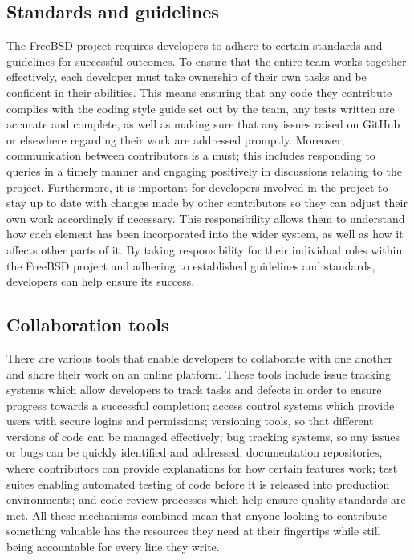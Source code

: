 \documentclass[12pt, dvipsnames, a4paper]{article}
\begin{document}
\subsection{	Standards and guidelines}
The FreeBSD project requires developers to adhere to certain standards and guidelines for successful outcomes. To ensure that the entire team works together effectively, each developer must take ownership of their own tasks and be confident in their abilities. This means ensuring that any code they contribute complies with the coding style guide set out by the team, any tests written are accurate and complete, as well as making sure that any issues raised on GitHub or elsewhere regarding their work are addressed promptly. Moreover, communication between contributors is a must; this includes responding to queries in a timely manner and engaging positively in discussions relating to the project. Furthermore, it is important for developers involved in the project to stay up to date with changes made by other contributors so they can adjust their own work accordingly if necessary. This responsibility allows them to understand how each element has been incorporated into the wider system, as well as how it affects other parts of it. By taking responsibility for their individual roles within the FreeBSD project and adhering to established guidelines and standards, developers can help ensure its success.
\subsection{Collaboration tools}
There are various tools that enable developers to collaborate with one another and share their work on an online platform. These tools include issue tracking systems which allow developers to track tasks and defects in order to ensure progress towards a successful completion; access control systems which provide users with secure logins and permissions; versioning tools, so that different versions of code can be managed effectively; bug tracking systems, so any issues or bugs can be quickly identified and addressed; documentation repositories, where contributors can provide explanations for how certain features work; test suites enabling automated testing of code before it is released into production environments; and code review processes which help ensure quality standards are met. All these mechanisms combined mean that anyone looking to contribute something valuable has the resources they need at their fingertips while still being accountable for every line they write.
\end{document}
